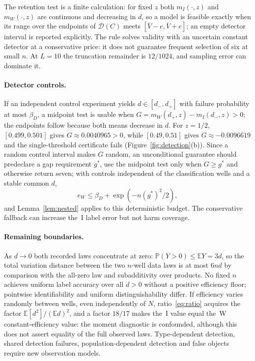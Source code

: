\documentclass[11pt,a4paper]{article}
\theoremstyle{plain}
\theoremstyle{definition}
\theoremstyle{remark}
\newcommand{\PP}{\mathbb P}
\newcommand{\EE}{\mathbb E}
\begin{document}
The retention test is a finite calculation: for fixed $z$ both $m_I(\cdot,z)$ and $m_W(\cdot,z)$ are continuous and decreasing in $d$, so a model is feasible exactly when its range over the endpoints of $\mathcal D(C)$ meets $[\bar V-e,\bar V+e]$; an empty detector interval is reported explicitly. The rule solves validity with an uncertain constant detector at a conservative price: it does not guarantee frequent selection of six at small $n$. At $L=10$ the truncation remainder is $12/1024$, and sampling error can dominate it.

\paragraph{Detector controls.} If an independent control experiment yields $d\in[d_-,d_+]$ with failure probability at most $\beta_D$, a midpoint test is usable when $G=m_W(d_+,z)-m_I(d_-,z)>0$; the endpoints follow because both means decrease in $d$. For $z=1/2$, $[0.499,0.501]$ gives $G\approx0.0040965>0$, while $[0.49,0.51]$ gives $G\approx-0.0096619$ and the single-threshold certificate fails (Figure~\ref{fig:detection}(b)). Since a random control interval makes $G$ random, an unconditional guarantee should predeclare a gap requirement $g^*$, use the midpoint test only when $G\ge g^*$ and otherwise return seven; with controls independent of the classification wells and a stable common $d$,
\begin{equation}\label{eq:control}
e_W\le\beta_D+\exp(-n(g^*)^2/2),
\end{equation}
and Lemma~\ref{lem:nested} applies to this deterministic budget. The conservative fallback can increase the~I label error but not harm coverage.

\paragraph{Remaining boundaries.} As $d\to0$ both recorded laws concentrate at zero: $\PP(Y>0)\le\EE Y=3d$, so the total variation distance between the two $n$-well data laws is at most $6nd$ by comparison with the all-zero law and subadditivity over products. No fixed $n$ achieves uniform label accuracy over all $d>0$ without a positive efficiency floor; pointwise identifiability and uniform distinguishability differ. If efficiency varies randomly between wells, even independently of $N$, ratio~\eqref{eq:ratio} acquires the factor $\EE[d^2]/(\EE d)^2$, and a factor $18/17$ makes the~I value equal the~W constant-efficiency value: the moment diagnostic is confounded, although this does not assert equality of the full observed laws. Type-dependent detection, shared detection failures, population-dependent detection and false objects require new observation models.
\end{document}
